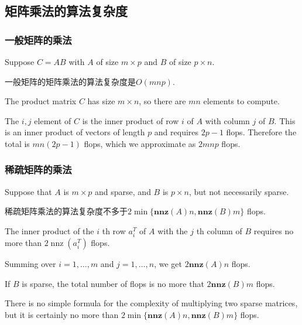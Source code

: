 \subsection{矩阵乘法的算法复杂度}

\subsubsection{一般矩阵的乘法}

\begin{theorem}
    Suppose $ C=A B $ with $ A $ of size $ m \times p $ and $ B $ of size $ p \times n $.

    一般矩阵的矩阵乘法的算法复杂度是$O(mnp)$.
\end{theorem}



The product matrix $ C $ has size $ m \times n $, so there are $ m n $ elements to compute. 

The $ i, j $ element of $ C $ is the inner product of row $ i $ of $ A $ with column $ j $ of $ B . $ This is an inner product of vectors of length $ p $ and requires $ 2 p-1 $ flops. Therefore the total is $ m n(2 p-1) $ flops, which we approximate as $ 2 m n p $ flops. 

\subsubsection{稀疏矩阵的乘法}

\begin{theorem}
    Suppose that $ A $ is $ m \times p $ and sparse, and $ B $ is $ p \times n $, but not necessarily sparse. 

    稀疏矩阵乘法的算法复杂度不多于$ 2 \min \{\mathbf{n n z}(A) n, \mathbf{n n z}(B) m\} $ flops.
\end{theorem}



The inner product of the $ i $ th row $ a_{i}^{T} $ of $ A $ with the $ j $ th column of $ B $ requires no more than $ 2 \operatorname{nnz}\left(a_{i}^{T}\right) $ flops. 

Summing over $ i=1, \ldots, m $ and $ j=1, \ldots, n $, we get $ 2 \mathbf{n n z}(A) n $ flops. 

If $ B $ is sparse, the total number of flops is no more that $ 2 \mathbf{n n z}(B) m $ flops. 

There is no simple formula for the complexity of multiplying two sparse matrices, but it is certainly no more than $ 2 \min \{\mathbf{n n z}(A) n, \mathbf{n n z}(B) m\} $ flops.

